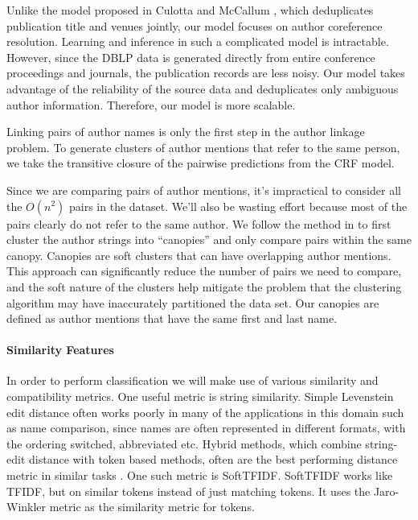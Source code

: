 \documentclass[twocolumn,letterpaper]{article}
\begin{document}
Unlike the model proposed in Culotta and McCallum
\cite{Culotta05aconditional}, which deduplicates publication title and
venues jointly, our model focuses on author coreference resolution.
Learning and inference in such a complicated model is intractable.
However, since the DBLP data is generated directly from entire
conference proceedings and journals, the publication records are less
noisy.  Our model takes advantage of the reliability of the source
data and deduplicates only ambiguous author information.  Therefore,
our model is more scalable.

Linking pairs of author names is only the first step in the author
linkage problem.  To generate clusters of author mentions that refer
to the same person, we take the transitive closure of the pairwise
predictions from the CRF model.

Since we are comparing pairs of author mentions, it's impractical to
consider all the $O(n^2)$ pairs in the dataset.  We'll also be wasting
effort because most of the pairs clearly do not refer to the same
author.  We follow the method in \cite{McCallum00} to first cluster
the author strings into ``canopies'' and only compare pairs within the
same canopy.  Canopies are soft clusters that can have overlapping
author mentions.  This approach can significantly reduce the number of
pairs we need to compare, and the soft nature of the clusters help
mitigate the problem that the clustering algorithm may have
inaccurately partitioned the data set.  Our canopies are defined as
author mentions that have the same first and last name.

\paragraph{Similarity Features} %
\label{par:similarity_features}
In order to perform classification we will make use of various similarity and compatibility metrics. One useful metric is string similarity. Simple Levenstein edit distance often works poorly in many of the applications in this domain such as name comparison, since names are often represented in different formats, with the ordering switched, abbreviated etc. Hybrid methods, which combine string-edit distance with token based methods, often are the best performing distance metric in similar tasks \cite{cohen2003comparison}. One such metric is SoftTFIDF. SoftTFIDF works like TFIDF, but on similar tokens instead of just matching tokens. It uses the Jaro-Winkler metric as the similarity metric for tokens. 
\end{document}
